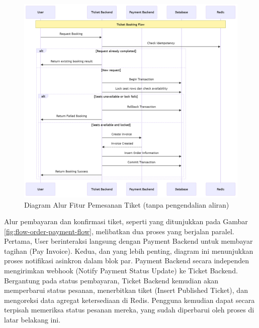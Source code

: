 \begin{figure}[H]
    \centering
    \includegraphics[width=1\textwidth]{resources/chapter-3/book-flow.png}
    \caption{Diagram Alur Fitur Pemesanan Tiket (tanpa pengendalian aliran)}
    \label{fig:flow-book-flow}
\end{figure}

\pagebreak

Alur pembayaran dan konfirmasi tiket, seperti yang ditunjukkan pada Gambar \ref{fig:flow-order-payment-flow}, melibatkan dua proses yang berjalan paralel. Pertama, User berinteraksi langsung dengan Payment Backend untuk membayar tagihan (Pay Invoice). Kedua, dan yang lebih penting, diagram ini menunjukkan proses notifikasi asinkron dalam blok par. Payment Backend secara independen mengirimkan webhook (Notify Payment Status Update) ke Ticket Backend. Bergantung pada status pembayaran, Ticket Backend kemudian akan memperbarui status pesanan, menerbitkan tiket (Insert Published Ticket), dan mengoreksi data agregat ketersediaan di Redis. Pengguna kemudian dapat secara terpisah memeriksa status pesanan mereka, yang sudah diperbarui oleh proses di latar belakang ini.

